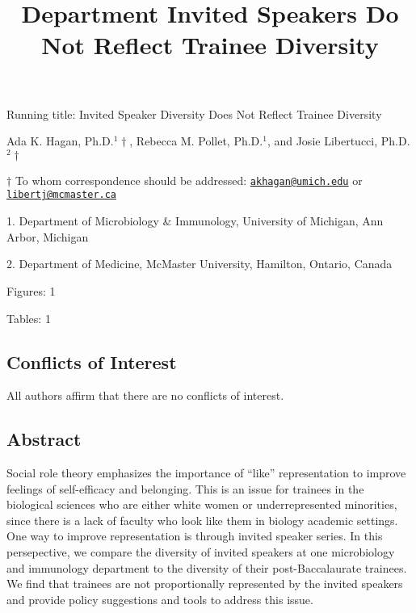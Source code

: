 \documentclass[10pt,]{article}
\title{\textbf{Department Invited Speakers Do Not Reflect Trainee Diversity}}
\author{}
\date{}
\begin{document}
\maketitle

\vspace{30mm}

Running title: Invited Speaker Diversity Does Not Reflect Trainee
Diversity

\vspace{35mm}

Ada K. Hagan, Ph.D.\({^1\dagger}\), Rebecca M. Pollet, Ph.D.\({^1}\),
and Josie Libertucci, Ph.D.\({^2\dagger}\)

\vspace{35mm}

\(\dagger\) To whom correspondence should be addressed:
\href{mailto:akhagan@umich.edu}{\nolinkurl{akhagan@umich.edu}} or
\href{mailto:libertj@mcmaster.ca}{\nolinkurl{libertj@mcmaster.ca}}

1. Department of Microbiology \& Immunology, University of Michigan, Ann
Arbor, Michigan

2. Department of Medicine, McMaster University, Hamilton, Ontario,
Canada

Figures: 1

Tables: 1

\newpage

\subsection{Conflicts of Interest}\label{conflicts-of-interest}

\vspace{40mm}

All authors affirm that there are no conflicts of interest.

\newpage

\linenumbers

\subsection{Abstract}\label{abstract}

Social role theory emphasizes the importance of ``like'' representation
to improve feelings of self-efficacy and belonging. This is an issue for
trainees in the biological sciences who are either white women or
underrepresented minorities, since there is a lack of faculty who look
like them in biology academic settings. One way to improve
representation is through invited speaker series. In this persepective,
we compare the diversity of invited speakers at one microbiology and
immunology department to the diversity of their post-Baccalaurate
trainees. We find that trainees are not proportionally represented by
the invited speakers and provide policy suggestions and tools to address
this issue.
\end{document}

